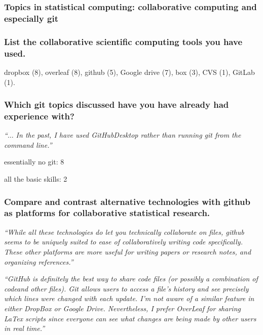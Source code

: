 \documentclass[12pt]{beamer}
\newcommand\ans[1]{{\it ``#1''}}
\newcommand\gap{\vspace{5mm}}
\begin{document}

\begin{frame}
  \frametitle{Topics in statistical computing: collaborative computing and especially git}
  
\end{frame}

\begin{frame} %

  \frametitle{List the collaborative scientific computing tools you have used.}

  dropbox (8), overleaf (8), github (5), Google drive (7), box (3), CVS (1), GitLab (1).
\end{frame}

\begin{frame} %

  \frametitle{Which git topics discussed have you have already had experience with?}

  \ans{$\dots$ In the past, I have used GitHubDesktop rather than running git from the command line.}

  \gap
  
  essentially no git: 8

  \gap
  
  all the basic skills: 2
  
\end{frame}

\begin{frame}   %

  \frametitle{Compare and contrast alternative technologies with github as platforms for collaborative statistical research.}


  \ans{While all these technologies do let you technically collaborate on files,  github seems to be uniquely suited to ease of collaboratively writing code specifically.  These other platforms are more useful for writing papers or research notes, and organizing references.}
  
\end{frame}

\begin{frame}

  \ans{GitHub is definitely the best way to share code files (or possibly a combination of codeand other files).  Git allows users to access a file’s history and see precisely which lines were changed with each update.  I’m not aware of a similar feature in either DropBox or Google Drive.  Nevertheless, I prefer OverLeaf for sharing LaTex scripts since everyone can see what changes are being made by other users in real time.}

  \end{frame}
\end{document}
